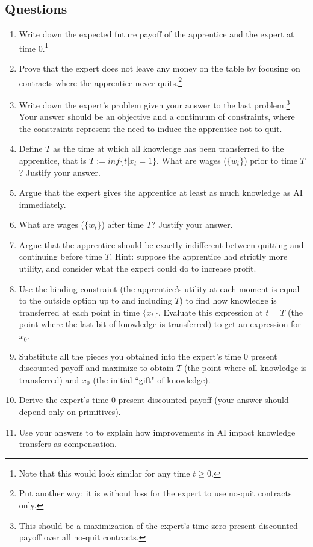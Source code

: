 \documentclass{article}
\begin{document}
\subsection{Questions}
\begin{enumerate}
    \item Write down the expected future payoff of the apprentice and the expert at time 0.\footnote{Note that this would look similar for any time $t\geq 0$.}

    \item Prove that the expert does not leave any money on the table by focusing on contracts where the apprentice never quits.\footnote{Put another way: it is without loss for the expert to use no-quit contracts only.}

    \item Write down the expert's problem given your answer to the last problem.\footnote{This should be a maximization of the expert's time zero present discounted payoff over all no-quit contracts.} Your answer should be an objective and a continuum of constraints, where the constraints represent the need to induce the apprentice not to quit.

    \item Define $T$ as the time at which all knowledge has been transferred to the apprentice, that is $T:=inf \{t|x_t=1\}$. What are wages ($\{w_t\}$) prior to time $T$? Justify your answer.

\item Argue that the expert gives the apprentice at least as much knowledge as AI immediately.

    \item What are wages ($\{w_t\}$) after time $T$? Justify your answer.

    \item Argue that the apprentice should be exactly indifferent between quitting and continuing before time $T$. Hint: suppose the apprentice had strictly more utility, and consider what the expert could do to increase profit.

    \item Use the binding constraint (the apprentice's utility at each moment is equal to the outside option up to and including $T$) to find how knowledge is transferred at each point in time $\{x_t\}$. Evaluate this expression at $t=T$ (the point where the last bit of knowledge is transferred) to get an expression for $x_0$.

    \item Substitute all the pieces you obtained into the expert's time 0 present discounted payoff and maximize to obtain $T$ (the point where all knowledge is transferred) and $x_0$ (the initial ``gift" of knowledge).

    \item Derive the expert's time 0 present discounted payoff (your answer should depend only on primitives). 
    
    \item Use your answers to to explain how improvements in AI impact knowledge transfers as compensation.

    
\end{enumerate}
\end{document}
